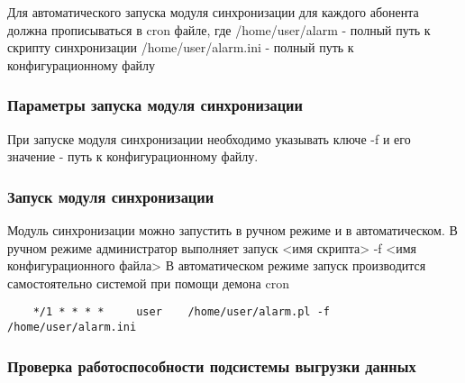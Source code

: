 \documentclass[12pt]{article}[a4paper,14pt,russian]
\begin{document}
    Для автоматического запуска модуля синхронизации для каждого абонента должна прописываться в 
    cron файле, где 
    /home/user/alarm - полный путь к скрипту синхронизации
    /home/user/alarm.ini - полный путь к конфигурационному файлу
    \subsubsection{Параметры запуска модуля синхронизации}
    При запуске модуля синхронизации необходимо указывать ключе -f и его значение - путь к конфигурационному файлу.
    \subsubsection{Запуск модуля синхронизации}
    Модуль синхронизации можно запустить в ручном режиме и в автоматическом. В ручном режиме администратор выполняет запуск 
    <имя скрипта> -f <имя конфигурационного файла>
	В автоматическом режиме запуск производится самостоятельно системой при помощи демона cron
    \begin{verbatim}
    */1 * * * *     user    /home/user/alarm.pl -f /home/user/alarm.ini
    \end{verbatim}
    \subsubsection{Проверка работоспособности подсистемы выгрузки данных}
	 
\end{document}
